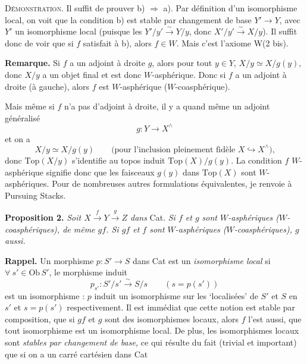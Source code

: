 \documentclass[11pt,leqno]{article}
\newcommand{\printedpage}[1]{\marginpar{\footnotesize p.~#1}}
\newcommand{\msp}[1]{\marginpar{\footnotesize [#1]}}
\newcommand{\Ob}{\mathrm{Ob}\,}
\begin{document}
\textsc{Démonstration.} Il suffit de prouver b) $\Longrightarrow$ a). Par définition d'un isomorphisme local, on voit que la condition b) est stable par changement de base $Y' \longrightarrow Y$, avec $Y'$ un isomorphisme local (puisque les $Y'/y' \xrightarrow{\sim} Y/y$, donc $X'/y' \xrightarrow{\sim} X/y$). Il suffit donc de voir que si $f$ satisfait à b), alors $f \in W$. Mais c'est l'axiome W(2 bis).

\begin{center}
\end{center}

\printedpage{20}

\textbf{Remarque.} Si $f$ a un adjoint à droite $g$, alors pour tout $y \in Y$, $X/y \simeq X/g(y)$, donc $X/y$ a un objet final et est donc $W$-asphérique. Donc si $f$ a un adjoint à droite (à gauche), alors $f$ est $W$-asphérique ($W$-coasphérique).

Mais même si $f$ n'a pas d'adjoint à droite, il y a quand même un adjoint généralisé
\[
g : Y \longrightarrow X^{\wedge}
\]
et on a
\[
X/y \simeq X/g(y) \qquad \text{(pour l'inclusion pleinement fidèle $X \hookrightarrow X^{\wedge}$),}
\]
donc $\mathrm{Top}(X/y)$ s'identifie au topos induit $\mathrm{Top}(X)/g(y)$. La condition $f$ $W$-asphérique signifie donc que les faisceaux $g(y)$ dans $\mathrm{Top}(X)$ sont
\msp{page 24}
$W$-asphériques. Pour de nombreuses autres formulations équivalentes, je renvoie à Pursuing Stacks.

\textbf{Proposition 2.} \textit{Soit $X \xrightarrow{f} Y \xrightarrow{g} Z$ dans} \textup{Cat}. \textit{Si $f$ et $g$ sont $W$-asphériques ($W$-coasphériques), de même $gf$. Si $gf$ et $f$ sont $W$-asphériques ($W$-coasphériques), $g$ aussi.}

\textbf{Rappel.} Un morphisme $p : S' \longrightarrow S$ dans Cat est un \textit{isomorphisme local} si $\forall\ s' \in \Ob S'$, le morphisme induit
\[
p_{s'} : S'/s' \xrightarrow{\sim} S/s \qquad (s = p(s'))
\]
est un isomorphisme : $p$ induit un isomorphisme sur les ‘localisées’ de $S'$ et $S$ en $s'$ et $s = p(s')$ respectivement. Il est immédiat que cette notion est stable par composition, que si $gf$ et $g$ sont des isomorphismes locaux, alors $f$ l'est aussi, que tout isomorphisme est un isomorphisme local. De plus, les isomorphismes locaux sont \textit{stables par changement de base,} ce qui résulte du fait (trivial et important) que si on a un carré cartésien dans Cat
\end{document}
